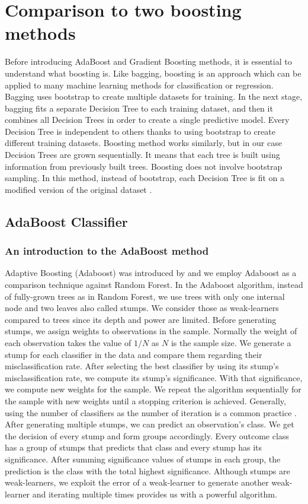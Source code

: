 \section{Comparison to two boosting methods}
Before introducing AdaBoost and Gradient Boosting methods, 
it is essential to understand what boosting is. 
Like bagging, boosting is an approach which can be applied to many machine learning methods for 
classification or regression. Bagging uses bootstrap to create multiple datasets for training. 
In the next stage, bagging fits a separate Decision Tree to each training dataset, 
and then it combines all Decision Trees in order to create a single predictive model. 
Every Decision Tree is independent to others thanks to using bootstrap to create different training datasets. 
Boosting method works similarly, but in our case Decision Trees are grown sequentially. 
It means that each tree is built using information from previously built trees. 
Boosting does not involve bootstrap sampling. 
In this method, instead of bootstrap, each Decision Tree is fit on a modified version of 
the original dataset \cite{James2013}.

\subsection{AdaBoost Classifier}
\label{sec:adaboost}

\subsubsection{An introduction to the AdaBoost method}
Adaptive Boosting (Adaboost) was introduced by \cite{freund1997boosting} and we employ Adaboost as a comparison 
technique against Random Forest. In the Adaboost algorithm, instead of fully-grown trees as in Random Forest, 
we use trees with only one internal node and two leaves also called stumps. We consider those as weak-learners 
compared to trees since its depth and power are limited. Before generating stumps, 
we assign weights to observations in the sample. Normally the weight of each observation takes the value 
of $1/N$ as $N$ is the sample size. We generate a stump for each classifier in the data and compare them regarding 
their misclassification rate. After selecting the best classifier by using its stump's misclassification rate,
we compute its stump's significance. With that significance, we compute new weights for the sample. 
We repeat the algorithm sequentially for the sample with new weights until a stopping criterion is achieved. 
Generally, using the number of classifiers as the number of iteration is a common practice \cite{friedman2001elements}. 
After generating multiple stumps, we can predict an observation's class. 
We get the decision of every stump and form groups accordingly. 
Every outcome class has a group of stumps that predicts that class and every stump has its significance. 
After summing significance values of stumps in each group, the prediction is the class with the total highest significance. 
Although stumps are weak-learners, we exploit the error of a weak-learner to generate another weak-learner 
and iterating multiple times provides us with a powerful algorithm.

